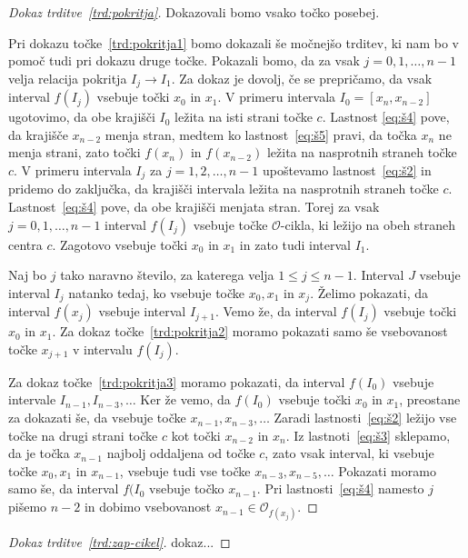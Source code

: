 \documentclass[mat2]{fmfdelo}
\begin{document}
\begin{proof}[Dokaz trditve~\ref{trd:pokritja}]
Dokazovali bomo vsako točko posebej. 

Pri dokazu točke~\ref{trd:pokritja1} bomo dokazali še močnejšo trditev, ki nam bo v pomoč tudi pri dokazu druge točke. Pokazali bomo, da za vsak $j = 0, 1, \dots, n-1$ velja relacija pokritja $I_j \to I_1$.  Za dokaz je dovolj, če se prepričamo, da vsak interval $f(I_j)$ vsebuje točki $x_0$ in $x_1$. V primeru intervala $I_0 = [x_n, x_{n-2}]$ ugotovimo, da obe krajišči $I_0$ ležita na isti strani točke $c$. Lastnost \ref{eq:š4} pove, da krajišče $x_{n-2}$ menja stran, medtem ko lastnost~\ref{eq:š5} pravi, da točka $x_n$ ne menja strani, zato točki $f(x_n)$ in $f(x_{n-2})$ ležita na nasprotnih straneh točke $c$. V primeru intervala $I_j$ za $j = 1, 2, \dots, n-1$ upoštevamo lastnost~\ref{eq:š2} in pridemo do zaključka, da krajišči intervala ležita na nasprotnih straneh točke $c$. Lastnost~\ref{eq:š4} pove, da obe krajišči menjata stran. Torej za vsak $j=0, 1, \dots, n-1$ interval $f(I_j)$ vsebuje točke $\mathcal{O}$-cikla, ki ležijo na obeh straneh centra $c$. Zagotovo vsebuje točki $x_0$ in $x_1$ in zato tudi interval $I_1$.

Naj bo $j$ tako naravno število, za katerega velja $1 \leq j \leq n-1$. Interval $J$ vsebuje interval $I_j$ natanko tedaj, ko vsebuje točke $x_0, x_1$ in $x_j$. Želimo pokazati, da interval $f(x_j)$ vsebuje interval $I_{j+1}$. Vemo že, da interval $f(I_j)$ vsebuje točki $x_0$ in $x_1$. Za dokaz točke~\ref{trd:pokritja2} moramo pokazati samo še vsebovanost točke $x_{j+1}$ v intervalu $f(I_j)$.

Za dokaz točke~\ref{trd:pokritja3} moramo pokazati, da interval $f(I_0)$ vsebuje intervale $I_{n-1}, I_{n-3}, \dots$ Ker že vemo, da $f(I_0)$ vsebuje točki $x_0$ in $x_1$, preostane za dokazati še, da vsebuje točke $x_{n-1}, x_{n-3}, \dots$ Zaradi lastnosti~\ref{eq:š2} ležijo vse točke na drugi strani točke $c$ kot točki $x_{n-2}$ in $x_n$. Iz lastnoti~\ref{eq:š3} sklepamo, da je točka $x_{n-1}$ najbolj oddaljena od točke $c$, zato vsak interval, ki vsebuje točke $x_0, x_1$ in $x_{n-1}$, vsebuje tudi vse točke $x_{n-3}, x_{n-5}, \dots$ Pokazati moramo samo še, da interval $f(I_0$ vsebuje točko $x_{n-1}$. Pri lastnosti~\ref{eq:š4} namesto $j$ pišemo $n-2$ in dobimo vsebovanost $x_{n-1} \in \mathcal{O}_{f(x_j)}$.

\end{proof}


\begin{proof}[Dokaz trditve~\ref{trd:zap-cikel}]
dokaz...
\end{proof}
\end{document}
